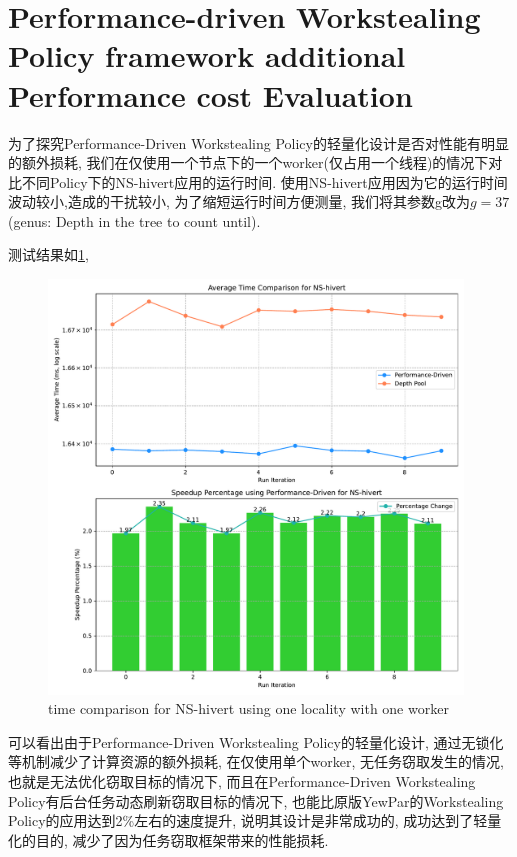 \documentclass{mproj}
\begin{document}
\section{Performance-driven Workstealing Policy framework additional Performance cost Evaluation}

为了探究Performance-Driven Workstealing Policy的轻量化设计是否对性能有明显的额外损耗,
我们在仅使用一个节点下的一个worker(仅占用一个线程)的情况下对比不同Policy下的NS-hivert应用的运行时间.
使用NS-hivert应用因为它的运行时间波动较小,造成的干扰较小,
为了缩短运行时间方便测量,
我们将其参数g改为$g = 37$(genus: Depth in the tree to count until).

测试结果如\cref{fig:time_comparison_ns_one_worker},
\begin{figure}[h]
    \centering %
    \includegraphics[width=0.98\textwidth]{images/time_comparison_ns_one_worker.pdf} %
    \caption{time comparison for NS-hivert using one locality with one worker} %
    \label{fig:time_comparison_ns_one_worker} %
\end{figure}
\FloatBarrier

可以看出由于Performance-Driven Workstealing Policy的轻量化设计,
通过无锁化等机制减少了计算资源的额外损耗,
在仅使用单个worker,
无任务窃取发生的情况,也就是无法优化窃取目标的情况下,
而且在Performance-Driven Workstealing Policy有后台任务动态刷新窃取目标的情况下,
也能比原版YewPar的Workstealing Policy的应用达到2\%左右的速度提升,
说明其设计是非常成功的,
成功达到了轻量化的目的,
减少了因为任务窃取框架带来的性能损耗.
\end{document}
